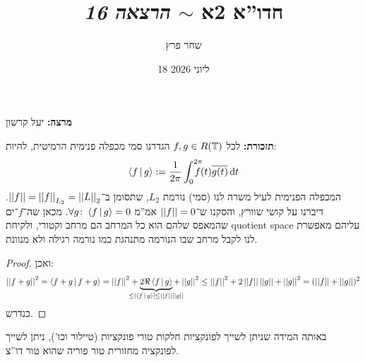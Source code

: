 \documentclass[]{../../../../tex/classes/styledArticle}
\author{שחר פרץ}
\title{חדו''א 2א $\sim$ \textit{הרצאה 16}}
\date{18 ליוני 2026}
\begin{document}
	\maketitle
	\textbf{מרצה: }יעל קרשון
	
	\textbf{תזכורת: }לכל $f, g \in R(\mathbb{T})$ הגדרנו סמי מכפלה פנימית הרמיטית, להיות: 
	\[ \left \langle f \,\middle|\, g \right \rangle := \frac{1}{2\pi}\int^{2\pi}_0\!\!\!\!\!\! f(t)\overline{g(t)}\,\mathrm{d}t \]
	המכפלה הפנימית לעיל משרה לנו (סמי) נורמת $L_2$, שתסומן ב־$\left \vert \left \vert f \right \vert \right \vert = \left \vert \left \vert f \right \vert \right \vert_{L_2} = \left \vert \left \vert L \right \vert \right \vert_2$. דיברנו על קושי שוורץ, והסקנו ש־$\left \vert \left \vert f \right \vert \right \vert = 0$ אמ''מ $\forall g \colon \left \langle f \,\middle|\, g \right \rangle = 0$. מכאן שה־$f$־ים שהמאפס שלהם הוא כל המרחב הם מרחב וקטורי, ולקיחת quotient space עליהם מאפשרת לנו לקבל מרחב שבו הנורמה מתנהגת כמו נורמה רגילה ולא מנוונת. 
	
	\begin{proof}
		ואכן: 
		\[ \norm{f + g}^{2} = \mut{f + g}{ f + g} = \norm {f}^{2} + \underbrace{2\Re\mut{f}{g}}_{\mathclap{\le \sof{\mut{f}{g}} \le \norm f \norm g}} + \norm {g}^{2} \le \norm{f}^{2} + 2 \norm f \norm g + \norm{g}^{2} = (\norm f + \norm g)^{2} \]
		כנדרש. 
	\end{proof}
	
	באותה המידה שניתן לשייך לפונקציות חלקות טורי פונקציות (טיילור וכו'), ניתן לשייך לפונקציה מחזורית טור פוריה שהוא טור דו''צ. 
	
	
\end{document}

